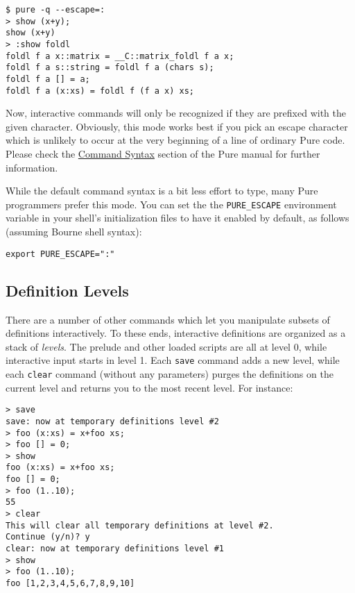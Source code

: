 \documentclass[a4paper,12pt]{article}
\begin{document}
\begin{lstlisting}
$ pure -q --escape=:
> show (x+y);
show (x+y)
> :show foldl
foldl f a x::matrix = __C::matrix_foldl f a x;
foldl f a s::string = foldl f a (chars s);
foldl f a [] = a;
foldl f a (x:xs) = foldl f (f a x) xs;
\end{lstlisting}

Now, interactive commands will only be recognized if they are prefixed with the given character. Obviously, this mode works best if you pick an escape character which is unlikely to occur at the very beginning of a line of ordinary Pure code. Please check the \href{https://agraef.github.io/pure-docs/pure.html#command-syntax}{Command Syntax} section of the Pure manual for further information.

While the default command syntax is a bit less effort to type, many Pure programmers prefer this mode. You can set the the \verb:PURE_ESCAPE: environment variable in your shell's initialization files to have it enabled by default, as follows (assuming Bourne shell syntax):

\begin{verbatim}
export PURE_ESCAPE=":"
\end{verbatim}

\subsection{Definition Levels}
\label{Levels}

There are a number of other commands which let you manipulate subsets of definitions interactively. To these ends, interactive definitions are organized as a stack of \emph{levels}. The prelude and other loaded scripts are all at level 0, while interactive input starts in level 1. Each \verb|save| command adds a new level, while each \verb|clear| command (without any parameters) purges the definitions on the current level and returns you to the most recent level. For instance:

\begin{lstlisting}
> save
save: now at temporary definitions level #2
> foo (x:xs) = x+foo xs;
> foo [] = 0;
> show
foo (x:xs) = x+foo xs;
foo [] = 0;
> foo (1..10);
55
> clear
This will clear all temporary definitions at level #2.
Continue (y/n)? y
clear: now at temporary definitions level #1
> show
> foo (1..10);
foo [1,2,3,4,5,6,7,8,9,10]
\end{lstlisting}
\end{document}
